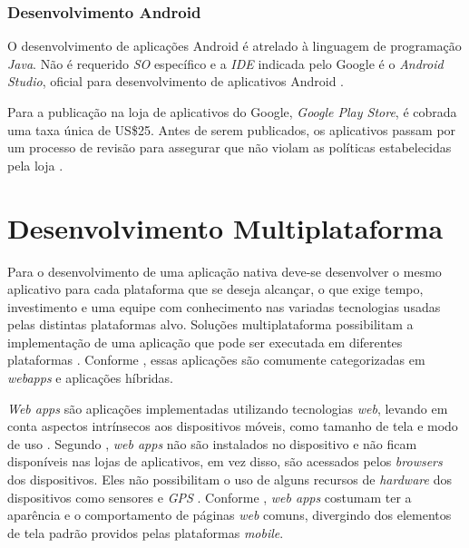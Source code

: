 \subsubsection{Desenvolvimento Android} \label{subsection:dev-android}

O desenvolvimento de aplicações Android é atrelado à linguagem de programação \textit{Java}.
Não é requerido \textit{SO} específico e a \textit{IDE} indicada pelo Google é o \textit{Android Studio}, oficial para desenvolvimento de aplicativos Android \cite{android_meet_2016}.

Para a publicação na loja de aplicativos do Google, \textit{Google Play Store}, é cobrada uma taxa única de US\$25. 
Antes de serem publicados, os aplicativos passam por um processo de revisão para assegurar que não violam as políticas estabelecidas pela loja \cite{meier_creating_2015}.  

\section{Desenvolvimento Multiplataforma} \label{section:desenvolvimentomulti}
Para o desenvolvimento de uma aplicação nativa deve-se desenvolver o mesmo aplicativo para cada plataforma que se deseja alcançar,
o que exige tempo, investimento e uma equipe com conhecimento nas variadas tecnologias usadas pelas distintas plataformas alvo.
Soluções multiplataforma possibilitam a implementação de uma aplicação que pode ser executada em diferentes plataformas \cite{kassas_taxonomy_2015}. 
Conforme , essas aplicações são comumente categorizadas em \textit{webapps} e aplicações híbridas.

\textit{Web apps} são aplicações implementadas utilizando tecnologias \textit{web}, levando em conta aspectos intrínsecos aos dispositivos móveis, 
como tamanho de tela e modo de uso \cite{heitkotter_evaluating_2013}. Segundo , \textit{web apps} não são instalados 
no dispositivo e não ficam disponíveis nas lojas de aplicativos, em vez disso, são acessados pelos \textit{browsers} dos dispositivos. Eles 
não possibilitam o uso de alguns recursos de \textit{hardware} dos dispositivos como sensores e \textit{GPS} \cite{heitkotter_evaluating_2013}. 
Conforme , \textit{web apps} costumam ter a aparência e o comportamento de páginas \textit{web} comuns, 
divergindo dos elementos de tela padrão providos pelas plataformas \textit{mobile}.

